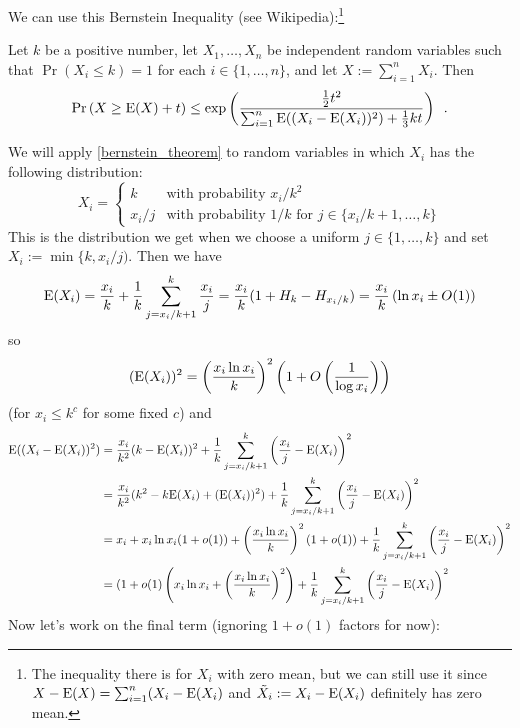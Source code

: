 \documentclass{patmorin}
\begin{document}
We can use this Bernstein Inequality (see Wikipedia):\footnote{The inequality there is for $X_i$ with zero mean, but we can still use it since $X-\mathrm{E}(X)=\sum_{i=1}^n (X_i-\mathrm{E}(X_i)$ and $\tilde{X}_i:=X_i-\mathrm{E}(X_i)$ definitely has zero mean.}

\begin{thm}\label{bernstein_theorem}
  Let $k$ be a positive number, let $X_1,\ldots,X_n$ be independent random variables such that $\Pr(X_i\le k)=1$ for each $i\in\{1,\ldots,n\}$, and let $X:=\sum_{i=1}^n X_i$. Then
  \begin{equation}
    \Pr\left(X \ge \mathrm{E}(X)+ t\right)
      \le \exp\left(\frac{\tfrac{1}{2}t^2}{\sum_{i=1}^n \mathrm{E}((X_i-\mathrm{E}(X_i))^2)+\tfrac{1}{3}kt}\right) \enspace . \label{bernstein}
  \end{equation}
\end{thm}
We will apply \cref{bernstein_theorem} to random variables in which $X_i$ has the following distribution:
\[
  X_i = \begin{cases}
          k & \text{with probability $x_i/k^2$} \\
          x_i/j & \text{with probability $1/k$ for $j\in\{x_i/k+1,\ldots,k\}$}
        \end{cases}
\]
This is the distribution we get when we choose a uniform $j\in\{1,\ldots,k\}$ and set $X_i:=\min\{k,x_i/j)$.
Then we have
\[
  \mathrm{E}(X_i)=\frac{x_i}{k} + \frac{1}{k}\sum_{j=x_i/k+1}^k \frac{x_i}{j}
  = \frac{x_i}{k}(1+H_{k}-H_{x_i/k}) = \frac{x_i}{k}\left(\ln x_i \pm O(1) \right)
\]
so
\[
  (\mathrm{E}(X_i))^2 = \left(\frac{x_i\ln x_i}{k}\right)^2\left(1+O\left(\frac{1}{\log x_i}\right)\right)
\]
(for $x_i\le k^c$ for some fixed $c$)
and
\begin{align*}
  \mathrm{E}((X_i-\mathrm{E}(X_i))^2)
  & = \frac{x_i}{k^2}(k-\mathrm{E}(X_i))^2
    + \frac{1}{k}\sum_{j=x_i/k+1}^k \left(\frac{x_i}{j}-\mathrm{E}(X_i)\right)^2 \\
  & = \frac{x_i}{k^2}(k^2-k\mathrm{E}(X_i)+(\mathrm{E}(X_i))^2)
    + \frac{1}{k}\sum_{j=x_i/k+1}^k \left(\frac{x_i}{j}-\mathrm{E}(X_i)\right)^2 \\
  & = x_i + x_i\ln x_i(1+o(1)) + \left(\frac{x_i\ln x_i}{k}\right)^2(1+o(1))
    + \frac{1}{k}\sum_{j=x_i/k+1}^k \left(\frac{x_i}{j}-\mathrm{E}(X_i)\right)^2 \\
  & = (1+o(1)\left(x_i\ln x_i + \left(\frac{x_i\ln x_i}{k}\right)^2\right)
    + \frac{1}{k}\sum_{j=x_i/k+1}^k \left(\frac{x_i}{j}-\mathrm{E}(X_i)\right)^2
\end{align*}
Now let's work on the final term (ignoring $1+o(1)$ factors for now):
\end{document}
